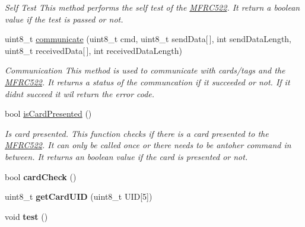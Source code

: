\begin{DoxyCompactItemize}
\begin{DoxyCompactList}\small\item\em Self Test  This method performs the self test of the \hyperlink{classMFRC522}{M\+F\+R\+C522}. It return a boolean value if the test is passed or not. \end{DoxyCompactList}\item 
\mbox{\label{classMFRC522_a993001f188f0f068d59442d1a8934dec}} 
uint8\+\_\+t \hyperlink{classMFRC522_a993001f188f0f068d59442d1a8934dec}{communicate} (uint8\+\_\+t cmd, uint8\+\_\+t send\+Data\mbox{[}$\,$\mbox{]}, int send\+Data\+Length, uint8\+\_\+t received\+Data\mbox{[}$\,$\mbox{]}, int received\+Data\+Length)
\begin{DoxyCompactList}\small\item\em Communication  This method is used to communicate with cards/tags and the \hyperlink{classMFRC522}{M\+F\+R\+C522}. It returns a status of the communcation if it succeeded or not. If it didnt succeed it wil return the error code. \end{DoxyCompactList}\item 
\mbox{\label{classMFRC522_af0780a36061b7ebc5dad0acda081985e}} 
bool \hyperlink{classMFRC522_af0780a36061b7ebc5dad0acda081985e}{is\+Card\+Presented} ()
\begin{DoxyCompactList}\small\item\em Is card presented.  This function checks if there is a card presented to the \hyperlink{classMFRC522}{M\+F\+R\+C522}. It can only be called once or there needs to be antoher command in between. It returns an boolean value if the card is presented or not. \end{DoxyCompactList}\item 
\mbox{\label{classMFRC522_ae9cfc4503cd73fcc900554b7f2fab263}} 
bool {\bfseries card\+Check} ()
\item 
\mbox{\label{classMFRC522_a1aa02a67f5ae52359b00f671a9f01917}} 
uint8\+\_\+t {\bfseries get\+Card\+U\+ID} (uint8\+\_\+t U\+ID\mbox{[}5\mbox{]})
\item 
\mbox{\label{classMFRC522_a83fd02f159c77b1f6003ae9816337a1b}} 
void {\bfseries test} ()
\end{DoxyCompactItemize}
